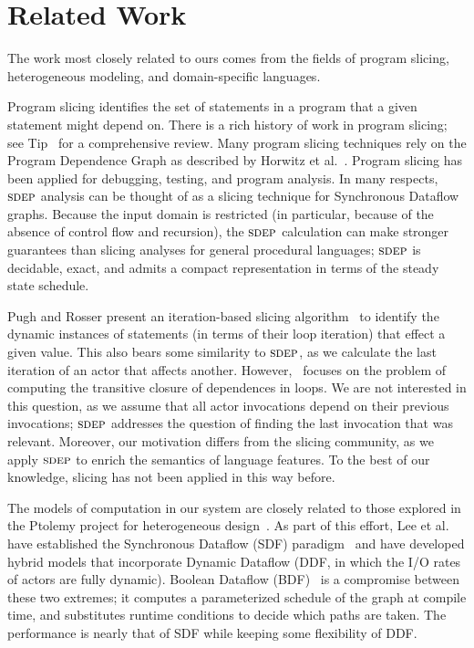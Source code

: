 \section{Related Work}

The work most closely related to ours comes from the fields of program
slicing, heterogeneous modeling, and domain-specific languages.

Program slicing identifies the set of statements in a program that a
given statement might depend on.  There is a rich history of work in
program slicing; see Tip~\cite{tip95slice} for a comprehensive review.
Many program slicing techniques rely on the Program Dependence Graph
as described by Horwitz et al.~\cite{hrb88pdg}.  Program slicing has
been applied for debugging, testing, and program analysis.  In many
respects, $\textsc{sdep}$ analysis can be thought of as a slicing technique
for Synchronous Dataflow graphs.  Because the input domain is
restricted (in particular, because of the absence of control flow and
recursion), the $\textsc{sdep}$ calculation can make stronger guarantees than
slicing analyses for general procedural languages; $\textsc{sdep}$ is
decidable, exact, and admits a compact representation in terms of the
steady state schedule.

Pugh and Rosser present an iteration-based slicing algorithm~\cite{pugh97slice}
to identify the dynamic instances of statements (in terms of
their loop iteration) that effect a given value.  This also bears
some similarity to $\textsc{sdep}$, as we calculate the last iteration of an
actor that affects another.  However,~\cite{pugh97slice} focuses on the
problem of computing the transitive closure of dependences in loops.
We are not interested in this question, as we assume that all actor
invocations depend on their previous invocations; $\textsc{sdep}$ addresses
the question of finding the last invocation that was relevant.
Moreover, our motivation differs from the slicing community, as we
apply $\textsc{sdep}$ to enrich the semantics of language features.  To the
best of our knowledge, slicing has not been applied in this way
before.

The models of computation in our system are closely related to those
explored in the Ptolemy project for heterogeneous
design~\cite{ptolemy03overview}.  As part of this effort, Lee et
al. have established the Synchronous Dataflow (SDF)
paradigm~\cite{LM87-i} and have developed hybrid models that
incorporate Dynamic Dataflow (DDF, in which the I/O rates of actors
are fully dynamic).  Boolean Dataflow (BDF)~\cite{ha97profile} is a
compromise between these two extremes; it computes a parameterized
schedule of the graph at compile time, and substitutes runtime
conditions to decide which paths are taken.  The performance is nearly
that of SDF while keeping some flexibility of DDF.  

